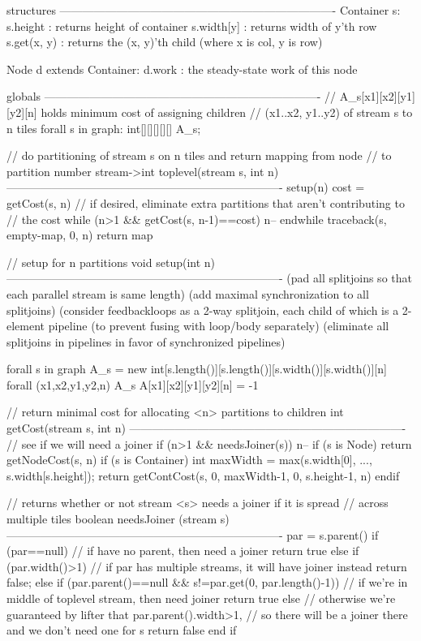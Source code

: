 structures
-------------------------------------------------------------------------
Container s:
  s.height       : returns height of container
  s.width[y]     : returns width of y'th row
  s.get(x, y)    : returns the (x, y)'th child (where x is col, y is row)

Node d extends Container:
  d.work         : the steady-state work of this node

globals
-------------------------------------------------------------------------
// A_s[x1][x2][y1][y2][n] holds minimum cost of assigning children 
// (x1..x2, y1..y2) of stream s to n tiles
forall s in graph:  int[][][][][] A_s;

// do partitioning of stream s on n tiles and return mapping from node
// to partition number
stream->int toplevel(stream s, int n)
-------------------------------------------------------------------------
setup(n)
cost = getCost(s, n)
// if desired, eliminate extra partitions that aren't contributing to
// the cost
while (n>1 && getCost(s, n-1)==cost)
  n--
endwhile
traceback(s, empty-map, 0, n)
return map

// setup for n partitions
void setup(int n) 
-------------------------------------------------------------------------
(pad all splitjoins so that each parallel stream is same length)
(add maximal synchronization to all splitjoins)
(consider feedbackloops as a 2-way splitjoin, each child of which is a
 2-element pipeline (to prevent fusing with loop/body separately)
(eliminate all splitjoins in pipelines in favor of synchronized pipelines)

forall s in graph
  A_s = new int[s.length()][s.length()][s.width()][s.width()][n]
  forall (x1,x2,y1,y2,n) \in A_s
    A[x1][x2][y1][y2][n] = -1

// return minimal cost for allocating <n> partitions to children
int getCost(stream s, int n)
-------------------------------------------------------------------------
// see if we will need a joiner
if (n>1 && needsJoiner(s)) 
  n--
if (s is Node)
  return getNodeCost(s, n)
if (s is Container)
  int maxWidth = max(s.width[0], ..., s.width[s.height]);
  return getContCost(s, 0, maxWidth-1, 0, s.height-1, n)
endif

// returns whether or not stream <s> needs a joiner if it is spread
// across multiple tiles
boolean needsJoiner (stream s)
-------------------------------------------------------------------------
par = s.parent()
if (par==null)
  // if have no parent, then need a joiner
  return true
else if (par.width()>1)
  // if par has multiple streams, it will have joiner instead
  return false;
else if (par.parent()==null && s!=par.get(0, par.length()-1))
  // if we're in middle of toplevel stream, then need joiner
  return true
else
  // otherwise we're guaranteed by lifter that par.parent().width>1,
  // so there will be a joiner there and we don't need one for s
  return false
end if
